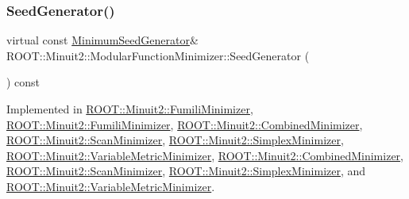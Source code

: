 \subsubsection{\texorpdfstring{SeedGenerator()}{SeedGenerator()}\hspace{0.1cm}{\footnotesize\ttfamily [1/2]}}
{\footnotesize\ttfamily virtual const \mbox{\hyperlink{classROOT_1_1Minuit2_1_1MinimumSeedGenerator}{Minimum\+Seed\+Generator}}\& R\+O\+O\+T\+::\+Minuit2\+::\+Modular\+Function\+Minimizer\+::\+Seed\+Generator (\begin{DoxyParamCaption}{ }\end{DoxyParamCaption}) const\hspace{0.3cm}{\ttfamily [pure virtual]}}



Implemented in \mbox{\hyperlink{classROOT_1_1Minuit2_1_1FumiliMinimizer_ad8906dbac7f0c20284e361be606d5634}{R\+O\+O\+T\+::\+Minuit2\+::\+Fumili\+Minimizer}}, \mbox{\hyperlink{classROOT_1_1Minuit2_1_1FumiliMinimizer_ad8906dbac7f0c20284e361be606d5634}{R\+O\+O\+T\+::\+Minuit2\+::\+Fumili\+Minimizer}}, \mbox{\hyperlink{classROOT_1_1Minuit2_1_1CombinedMinimizer_a667ce6c321b6948d37087a2ac06be58c}{R\+O\+O\+T\+::\+Minuit2\+::\+Combined\+Minimizer}}, \mbox{\hyperlink{classROOT_1_1Minuit2_1_1ScanMinimizer_aaad34811cf2862cd8b66b634a1c9ba07}{R\+O\+O\+T\+::\+Minuit2\+::\+Scan\+Minimizer}}, \mbox{\hyperlink{classROOT_1_1Minuit2_1_1SimplexMinimizer_a7385d3ee5e4a48a796b11b51f7f0c408}{R\+O\+O\+T\+::\+Minuit2\+::\+Simplex\+Minimizer}}, \mbox{\hyperlink{classROOT_1_1Minuit2_1_1VariableMetricMinimizer_a8ac2123142283dd05611842236caeadb}{R\+O\+O\+T\+::\+Minuit2\+::\+Variable\+Metric\+Minimizer}}, \mbox{\hyperlink{classROOT_1_1Minuit2_1_1CombinedMinimizer_a667ce6c321b6948d37087a2ac06be58c}{R\+O\+O\+T\+::\+Minuit2\+::\+Combined\+Minimizer}}, \mbox{\hyperlink{classROOT_1_1Minuit2_1_1ScanMinimizer_aaad34811cf2862cd8b66b634a1c9ba07}{R\+O\+O\+T\+::\+Minuit2\+::\+Scan\+Minimizer}}, \mbox{\hyperlink{classROOT_1_1Minuit2_1_1SimplexMinimizer_a7385d3ee5e4a48a796b11b51f7f0c408}{R\+O\+O\+T\+::\+Minuit2\+::\+Simplex\+Minimizer}}, and \mbox{\hyperlink{classROOT_1_1Minuit2_1_1VariableMetricMinimizer_a8ac2123142283dd05611842236caeadb}{R\+O\+O\+T\+::\+Minuit2\+::\+Variable\+Metric\+Minimizer}}.

